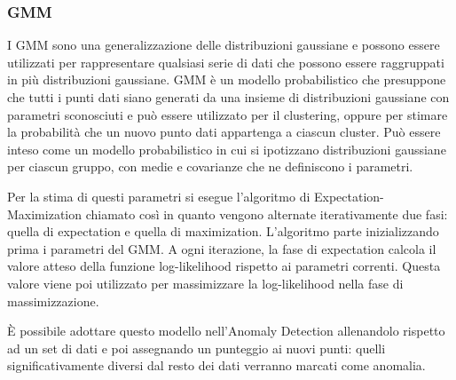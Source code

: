 \subsubsection{GMM}
I GMM \cite{aggarwal2015outlier} sono una generalizzazione delle distribuzioni gaussiane e possono essere utilizzati per rappresentare qualsiasi serie di dati che possono essere raggruppati in più distribuzioni gaussiane. GMM è un modello probabilistico che presuppone che tutti i punti dati siano generati da una insieme di distribuzioni gaussiane con parametri sconosciuti e può essere utilizzato per il clustering, oppure per stimare la probabilità che un nuovo punto dati appartenga a ciascun cluster. Può essere inteso come un modello probabilistico in cui si ipotizzano distribuzioni gaussiane per ciascun gruppo, con medie e covarianze che ne definiscono i parametri.

Per la stima di questi parametri si esegue l'algoritmo di Expectation-Maximization chiamato così in quanto vengono alternate iterativamente due fasi: quella di expectation e quella di maximization. L'algoritmo parte inizializzando prima i parametri del GMM. A ogni iterazione, la fase di expectation calcola il valore atteso della funzione log-likelihood rispetto ai parametri correnti. Questa valore viene poi utilizzato per massimizzare la log-likelihood nella fase di massimizzazione.

È possibile adottare questo modello nell'Anomaly Detection allenandolo rispetto ad un set di dati e poi assegnando un punteggio ai nuovi punti: quelli significativamente diversi dal resto dei dati verranno marcati come anomalia.

